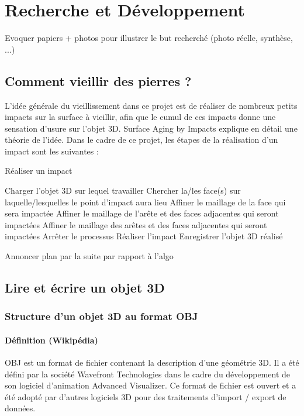 \documentclass[a4paper,french]{report}
\begin{document}
	\chapter{Recherche et Développement}
		Evoquer papiers + photos pour illustrer le but recherché (photo réelle, synthèse, ...)
		\section{Comment vieillir des pierres ?}
			L'idée générale du vieillissement dans ce projet est de réaliser de nombreux petits impacts sur la surface à vieillir, afin que le cumul de ces impacts donne une sensation d'usure sur l'objet 3D. Surface Aging by Impacts \cite{PPD01} explique en détail une théorie de l'idée. Dans le cadre de ce projet, les étapes de la réalisation d'un impact sont les suivantes : 
			\begin{algorithm}[H]
				\caption{Réaliser un impact}
				\begin{algorithmic}[1]
					\STATE Charger l'objet 3D sur lequel travailler
					\REPEAT
						\REPEAT
							\STATE Chercher la/les face(s) sur laquelle/lesquelles le point d'impact aura lieu
								\STATE Affiner le maillage de la face qui sera impactée
								\STATE Affiner le maillage de l'arête et des faces adjacentes qui seront impactées
								\STATE Affiner le maillage des arêtes et des faces adjacentes qui seront impactées
							\ELSE
								\STATE Arrêter le processus
							\ENDIF
						\STATE Réaliser l'impact
					\STATE Enregistrer l'objet 3D réalisé
				\end{algorithmic}
			\end{algorithm}
			
		Annoncer plan par la suite par rapport à l'algo	
		\section{Lire et écrire un objet 3D}
			\subsection{Structure d'un objet 3D au format OBJ}
				\subsubsection{Définition (Wikipédia)}
				OBJ est un format de fichier contenant la description d'une géométrie 3D. Il a été défini par la société Wavefront Technologies dans le cadre du développement de son logiciel d'animation Advanced Visualizer. Ce format de fichier est ouvert et a été adopté par d'autres logiciels 3D pour des traitements d'import / export de données.
\end{document}
